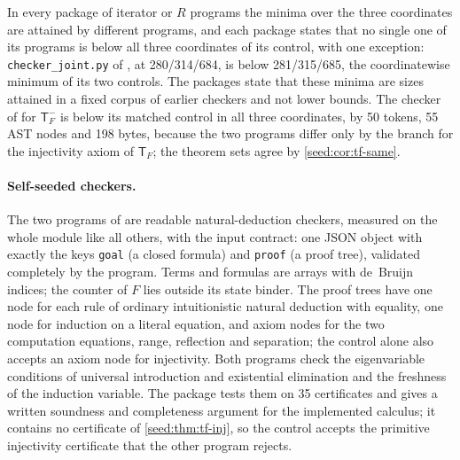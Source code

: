 In every package of iterator or $R$ programs the minima over the three
coordinates are attained by different programs, and each package states that
no single one of its programs is below all three coordinates of its control,
with one exception:
\texttt{checker\_joint.py} of , at 280/314/684, is
below 281/315/685, the coordinatewise minimum of its two controls. The
packages state that these minima are sizes attained in a fixed corpus of
earlier checkers and not lower bounds. The checker of
 for $\mathsf{T}_F^{-}$ is below its matched
control in all three coordinates, by 50 tokens, 55 AST nodes and 198 bytes,
because the two programs differ only by the branch for the injectivity axiom
of $\mathsf{T}_F$; the theorem sets agree by \cref{seed:cor:tf-same}.

\paragraph{Self-seeded checkers.}
The two programs of  are readable natural-deduction
checkers, measured on the whole module like all others, with the input
contract: one JSON object with exactly the keys \texttt{goal} (a closed
formula) and \texttt{proof} (a proof tree), validated completely by the
program. Terms and formulas are arrays with de~Bruijn indices; the counter of
$F$ lies outside its state binder. The proof trees have one node for each
rule of ordinary intuitionistic natural deduction with equality, one node for
induction on a literal equation, and axiom nodes for the two computation
equations, range, reflection and separation; the control alone also accepts
an axiom node for injectivity. Both programs check the eigenvariable
conditions of universal introduction and existential elimination and the
freshness of the induction variable. The package tests them on 35
certificates and gives a written soundness and completeness argument for the
implemented calculus; it contains no certificate of
\cref{seed:thm:tf-inj}, so the control accepts the primitive injectivity
certificate that the other program rejects.


